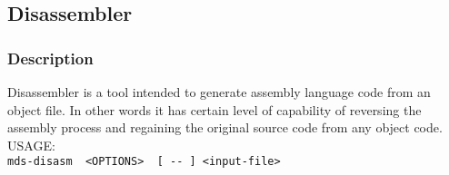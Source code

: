     \subsection{Disassembler}
        \subsubsection{Description}
            Disassembler is a tool intended to generate assembly language code from an object file. In other words it has certain level of
            capability of reversing the assembly process and regaining the original source code from any object code.\\

            USAGE:
            {
                ~\\
                \usecodefont
                \verb'mds-disasm  <OPTIONS>  [ -- ] <input-file>'\\
            }
